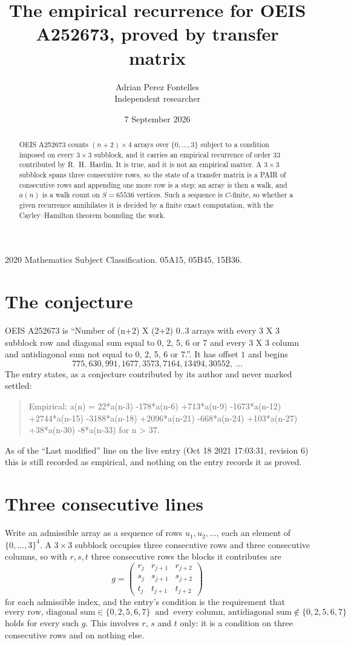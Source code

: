\documentclass[11pt,a4paper]{article}
\title{The empirical recurrence for OEIS A252673, proved by transfer matrix}
\author{Adrian Perez Fontelles\\ \small Independent researcher}
\date{7 September 2026}
\theoremstyle{plain}
\theoremstyle{definition}
\begin{document}
\maketitle

\begin{abstract}
OEIS A252673 counts $(n+2)\times4$ arrays over $\{0,\dots,3\}$ subject to a condition imposed on
every $3\times3$ subblock, and it carries an empirical recurrence of order $33$
contributed by R.~H.~Hardin. It is true, and it is not an empirical matter. A $3\times3$
subblock spans three consecutive rows, so the state of a transfer matrix is a PAIR of
consecutive rows and appending one more row is a step; an array is then a walk, and
$a(n)$ is a walk count on $S=65536$ vertices. Such a sequence is $C$-finite, so whether a given
recurrence annihilates it is decided by a finite exact computation, with the Cayley--Hamilton
theorem bounding the work.
\end{abstract}

\noindent\small 2020 Mathematics Subject Classification. 05A15, 05B45, 15B36.\normalsize

\section{The conjecture}

OEIS A252673 is ``Number of (n+2) X (2+2) 0..3 arrays with every 3 X 3 subblock row and diagonal sum equal to 0, 2, 5, 6 or 7 and every 3 X 3 column and antidiagonal sum not equal to 0, 2, 5, 6 or 7.''. It has offset $1$ and begins
\[
775, 630, 991, 1677, 3573, 7164, 13494, 30552,\ \dots
\]
The entry states, as a conjecture contributed by its author and never marked settled:
\begin{quote}
Empirical: a(n) = 22*a(n-3) -178*a(n-6) +713*a(n-9) -1673*a(n-12) +2744*a(n-15) -3188*a(n-18) +2096*a(n-21) -668*a(n-24) +103*a(n-27) +38*a(n-30) -8*a(n-33) for n > 37.
\end{quote}
As of the ``Last modified'' line on the live entry (Oct 18 2021 17:03:31, revision 6) this is still
recorded as empirical, and nothing on the entry records it as proved.

\section{Three consecutive lines}

Write an admissible array as a sequence of rows $u_1,u_2,\dots$, each an element of
$\{0,\dots,3\}^{4}$. A $3\times3$ subblock occupies three consecutive rows and
three consecutive columns, so with $r,s,t$ three consecutive rows the blocks it
contributes are
\[
g=\begin{pmatrix}r_j&r_{j+1}&r_{j+2}\\ s_j&s_{j+1}&s_{j+2}\\ t_j&t_{j+1}&t_{j+2}\end{pmatrix}
\]
for each admissible index, and the entry's condition is the requirement that
\[
\text{every row, diagonal sum} \in \{0,2,5,6,7\}\ \text{ and }\ \text{every column, antidiagonal sum} \notin \{0,2,5,6,7\}
\]
holds for every such $g$. This involves $r$, $s$ and $t$ only: it is a condition on
three consecutive rows and on nothing else.
\end{document}
